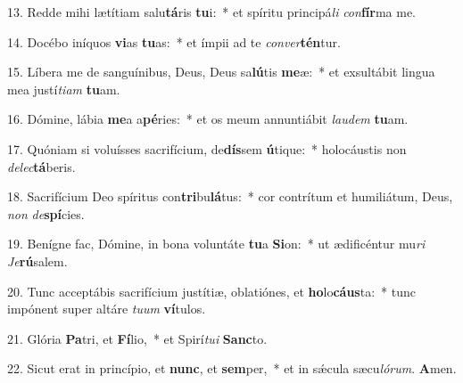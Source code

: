 13. Redde mihi lætítiam salu\textbf{tá}ris \textbf{tu}i:~* et spíritu principá\textit{li} \textit{con}\textbf{fír}ma me.

14. Docébo iníquos \textbf{vi}as \textbf{tu}as:~* et ímpii ad te \textit{con}\textit{ver}\textbf{tén}tur.

15. Líbera me de sanguínibus, Deus, Deus sa\textbf{lú}tis \textbf{me}æ:~* et exsultábit lingua mea justí\textit{ti}\textit{am} \textbf{tu}am.

16. Dómine, lábia \textbf{me}a a\textbf{pé}ries:~* et os meum annuntiábit \textit{lau}\textit{dem} \textbf{tu}am.

17. Quóniam si voluísses sacrifícium, de\textbf{dís}sem \textbf{ú}tique:~* holocáustis non \textit{de}\textit{lec}\textbf{tá}beris.

18. Sacrifícium Deo spíritus con\textbf{tri}bu\textbf{lá}tus:~* cor contrítum et humiliátum, Deus, \textit{non} \textit{de}\textbf{spí}cies.

19. Benígne fac, Dómine, in bona voluntáte \textbf{tu}a \textbf{Si}on:~* ut ædificéntur mu\textit{ri} \textit{Je}\textbf{rú}salem.

20. Tunc acceptábis sacrifícium justítiæ, oblatiónes, et \textbf{ho}lo\textbf{cáus}ta:~* tunc impónent super altáre \textit{tu}\textit{um} \textbf{ví}tulos.

21. Glória \textbf{Pa}tri, et \textbf{Fí}lio,~* et Spirí\textit{tu}\textit{i} \textbf{Sanc}to.

22. Sicut erat in princípio, et \textbf{nunc}, et \textbf{sem}per,~* et in s\'{\ae}cula sæcu\textit{ló}\textit{rum}. \textbf{A}men.